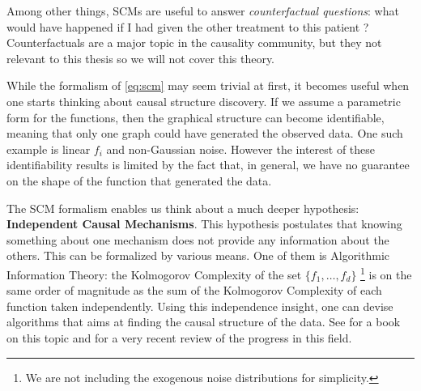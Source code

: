 Among other things, SCMs are useful to answer \textit{counterfactual questions}: what would have happened if I had given the other treatment to this patient ?  Counterfactuals are a major topic in the causality community, but they not relevant to this thesis so we will not cover this theory.

While the formalism of \eqref{eq:scm} may seem trivial at first, it becomes useful when one starts thinking about causal structure discovery. 
If we assume a parametric form for the functions, then the graphical structure can become identifiable, meaning that only one graph could have generated the observed data. One such example is linear $f_i$ and non-Gaussian noise. 
However the interest of these identifiability results is limited by the fact that, in general, we have no guarantee on the shape of the function that generated the data. 

The SCM formalism enables us think about a much deeper hypothesis: \textbf{Independent Causal Mechanisms}. This hypothesis postulates that knowing something about one mechanism does not provide any information about the others. This can be formalized by various means. One of them is Algorithmic Information Theory: the Kolmogorov Complexity of the set $\{ f_1, \dots, f_d \}$
\footnote{We are not including the exogenous noise distributions for simplicity.}
is on the same order of magnitude as the sum of the Kolmogorov Complexity of each function taken independently. 
Using this independence insight, one can devise algorithms that aims at finding the causal structure of the data. See \citet{peters2017elements} for a book on this topic and \citet{scholkopf2019causality} for a very recent review of the progress in this field. 